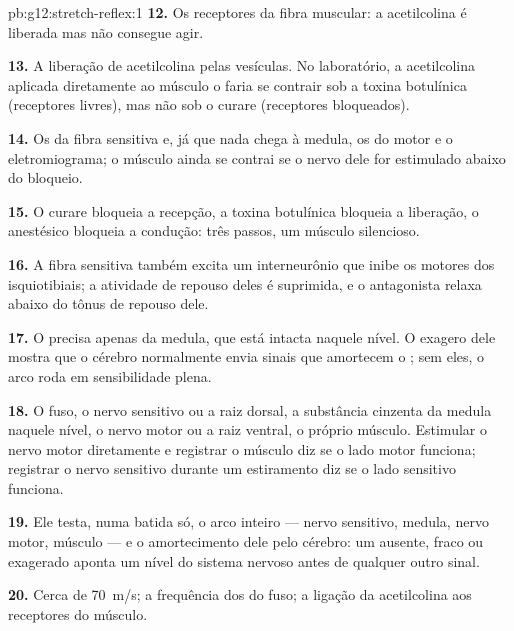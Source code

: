 \begin{solution}{pb:g12:stretch-reflex:1}
\textbf{12.} Os receptores da fibra muscular: a acetilcolina é liberada
mas não consegue agir.

\textbf{13.} A liberação de acetilcolina pelas vesículas. No
laboratório, a acetilcolina aplicada diretamente ao músculo o faria se
contrair sob a toxina botulínica (receptores livres), mas não sob o
curare (receptores bloqueados).

\textbf{14.} Os  da fibra sensitiva e, já que nada
chega à medula, os do  motor e o eletromiograma; o músculo
ainda se contrai se o nervo dele for estimulado abaixo do bloqueio.

\textbf{15.} O curare bloqueia a recepção, a toxina botulínica bloqueia
a liberação, o anestésico bloqueia a condução: três passos, um músculo silencioso.

\textbf{16.} A fibra sensitiva também excita um interneurônio que inibe
os  motores dos isquiotibiais; a atividade de repouso deles é
suprimida, e o antagonista relaxa abaixo do tônus de repouso dele.

\textbf{17.} O  precisa apenas da medula, que está intacta
naquele nível. O exagero dele mostra que o cérebro normalmente envia
sinais que amortecem o ; sem eles, o arco roda em sensibilidade plena.

\textbf{18.} O fuso, o nervo sensitivo ou a raiz dorsal, a substância
cinzenta da medula naquele nível, o nervo motor ou a raiz ventral, o
próprio músculo. Estimular o nervo motor diretamente e registrar o
músculo diz se o lado motor funciona; registrar o nervo sensitivo
durante um estiramento diz se o lado sensitivo funciona.

\textbf{19.} Ele testa, numa batida só, o arco inteiro --- nervo
sensitivo, medula, nervo motor, músculo --- e o amortecimento dele pelo
cérebro: um  ausente, fraco ou exagerado aponta um nível do
sistema nervoso antes de qualquer outro sinal.

\textbf{20.} Cerca de \qty{70}{m/s}; a frequência dos  do fuso; a ligação da acetilcolina aos receptores do músculo.
\end{solution}

